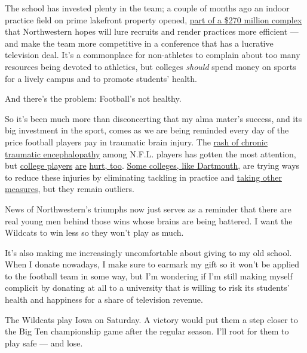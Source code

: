 The school has invested plenty in the team; a couple of months ago an
indoor practice field on prime lakefront property opened,
\href{https://www.chicagotribune.com/sports/college/ct-spt-northwestern-athletics-facility-football-20180802-story.html}{part
of a \$270 million complex} that Northwestern hopes will lure recruits
and render practices more efficient --- and make the team more
competitive in a conference that has a lucrative television deal. It's a
commonplace for non-athletes to complain about too many resources being
devoted to athletics, but colleges \emph{should} spend money on sports
for a lively campus and to promote students' health.

And there's the problem: Football's not healthy.

So it's been much more than disconcerting that my alma mater's success,
and its big investment in the sport, comes as we are being reminded
every day of the price football players pay in traumatic brain injury.
The
\href{https://www.nytimes.com/interactive/2017/07/25/sports/football/nfl-cte.html}{rash
of chronic traumatic encephalopathy} among N.F.L. players has gotten the
most attention, but
\href{https://www.nytimes.com/2010/09/14/sports/14football.html}{college
players}
\href{https://concussionfoundation.org/CTE-resources/cte-college-football}{are}
\href{https://www.today.com/health/college-football-player-tyler-hilinski-who-died-suicide-had-cte-t131843}{hurt,
too}.
\href{https://www.nytimes.com/2018/10/26/sports/ivy-league-football-dartmouth.html?action=click\&module=RelatedCoverage\&pgtype=Article\&region=Footer}{Some
colleges, like Dartmouth}, are trying ways to reduce these injuries by
eliminating tackling in practice and
\href{http://www.espn.com/college-football/story/_/id/24859819/concussions-drop-ivy-league-football-kickoff-change}{taking
other measures}, but they remain outliers.

News of Northwestern's triumphs now just serves as a reminder that there
are real young men behind those wins whose brains are being battered. I
want the Wildcats to win less so they won't play as much.

It's also making me increasingly uncomfortable about giving to my old
school. When I donate nowadays, I make sure to earmark my gift so it
won't be applied to the football team in some way, but I'm wondering if
I'm still making myself complicit by donating at all to a university
that is willing to risk its students' health and happiness for a share
of television revenue.

The Wildcats play Iowa on Saturday. A victory would put them a step
closer to the Big Ten championship game after the regular season. I'll
root for them to play safe --- and lose.

